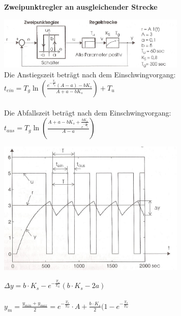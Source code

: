 	\vspace{.5cm}
		\textbf{Zweipunktregler an ausgleichender Strecke } \\
		\begin{minipage}{9cm}
 		\includegraphics[width=9cm]{./bilder/ZweipunktreglerTotglied2.jpg}\\
			Die Anstiegszeit beträgt nach dem Einschwingvorgang:
			$\boxed{t_{ein} = T_g\ln(\frac{e^{-\frac{T_u}{T_g}}(A-a)-b K_s}{A+a-b K_s})+T_u}$\\ \\
			Die Abfallszeit beträgt nach dem Einschwingvorgang:
			$\boxed{t_{aus} = T_g\ln(\frac{A+a-b
			K_s+\frac{b K_s}{e^{-\frac{T_u}{T_g}}}}{A-a})}$\\
        \end{minipage}
		\begin{minipage}{9cm}
		\includegraphics[width=9cm]{./bilder/ZweipunktreglerTotglied_dia.jpg}			
        \end{minipage}
    
 	$\Delta y = b\cdot K_s - e^{-\frac{T_u}{T_G}}(b\cdot K_s - 2a) \quad$\\ \\
	$y_m = \frac{y_{min}+y_{max}}{2}=e^{-\frac{T_u}{T_G}}\cdot A + \frac{b\cdot K_s}{2}(1-e^{-\frac{T_u}{T_G}}$
\newpage


